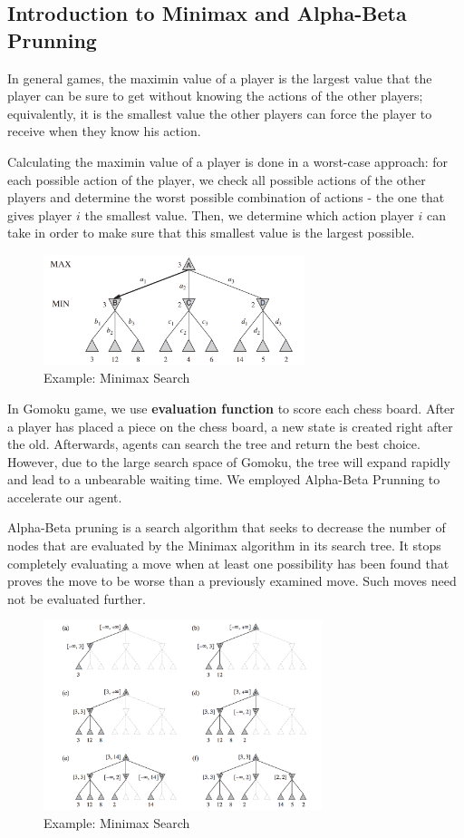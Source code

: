 \documentclass[12pt,a4paper]{article}
\begin{document}
\subsection{Introduction to Minimax and Alpha-Beta Prunning}

In general games, the maximin value of a player is the largest value that the player can be sure to get without knowing the actions of the other players; equivalently, it is the smallest value the other players can force the player to receive when they know his action\cite{ai}.

Calculating the maximin value of a player is done in a worst-case approach: for each possible action of the player, we check all possible actions of the other players and determine the worst possible combination of actions - the one that gives player $i$ the smallest value. Then, we determine which action player $i$ can take in order to make sure that this smallest value is the largest possible.

\begin{figure}[!h]
\centering\includegraphics[width=3in]{3.png}
\caption{Example: Minimax Search}
\end{figure}

In Gomoku game, we use \textbf{evaluation function} to score each chess board. After a player has placed a piece on the chess board, a new state is created right after the old. Afterwards, agents can search the tree and return the best choice. However, due to the large search space of Gomoku, the tree will expand rapidly and lead to a unbearable waiting time. We employed Alpha-Beta Prunning to accelerate our agent.

Alpha-Beta pruning is a search algorithm that seeks to decrease the number of nodes that are evaluated by the Minimax algorithm in its search tree. It stops completely evaluating a move when at least one possibility has been found that proves the move to be worse than a previously examined move. Such moves need not be evaluated further.

\begin{figure}[!h]
\centering\includegraphics[width=3.2in]{4.png}
\caption{Example: Minimax Search}
\end{figure}
\end{document}
